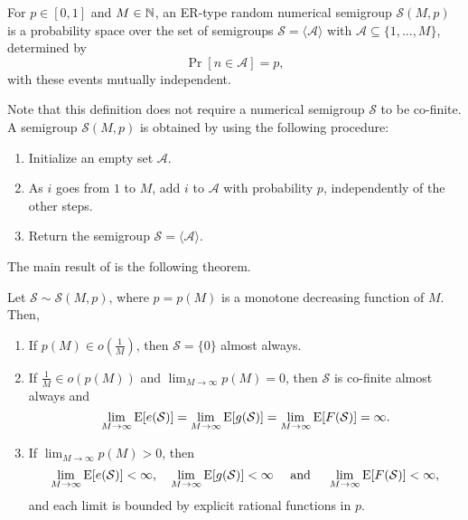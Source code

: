 \begin{definition}\label{def:randnumsems:ermodel}
    For $p \in [0, 1]$ and $M \in \mathbb{N}$, an ER-type random numerical semigroup $\mathcal{S}(M, p)$ is a probability space over the set of semigroups $\mathcal{S} = \langle\mathcal{A}\rangle$ with $\mathcal{A} \subseteq \{1,...,M\}$, determined by
    \[\Pr[n \in \mathcal{A}] = p,\]
    with these events mutually independent.
\end{definition}
Note that this definition does not require a numerical semigroup $\mathcal{S}$ to be co-finite. A semigroup $\mathcal{S}(M, p)$ is obtained by using the following procedure:
\begin{enumerate}
    \item Initialize an empty set $\mathcal{A}$.
    \item As $i$ goes from $1$ to $M$, add $i$ to $\mathcal{A}$ with probability $p$, independently of the other steps.
    \item Return the semigroup $\mathcal{S} = \langle\mathcal{A}\rangle$.
\end{enumerate}

The main result of \cite{de2018random} is the following theorem.  

\begin{theorem}\label{thm:ermodel} Let $\mathcal{S} \sim \mathcal{S}(M, p)$, where $p = p(M)$ is a monotone decreasing function of $M$. Then, 
    \begin{enumerate}[label=(\alph*)]
        \item If $p(M) \in o\left(\frac{1}{M}\right)$, then $\mathcal{S} = \{0\}$ almost always.
        \item If $\frac{1}{M} \in o(p(M))$ and $\lim_{M \to \infty} p(M)= 0$, then $\mathcal{S}$ is co-finite almost always and
         \[\lim_{M \to  \infty} \mathrm{E}[e(\mathcal{S})] = \lim_{M \to \infty} \mathrm{E}[g(\mathcal{S})] = \lim_{M \to \infty} \mathrm{E}[F(\mathcal{S})] = \infty.\]
        \item If $\lim_{M \to \infty} p(M) > 0$, then
        \[\lim_{M \to \infty} \mathrm{E}[e(\mathcal{S})] < \infty,  \quad \lim_{M \to \infty} \mathrm{E}[g(\mathcal{S})] < \infty \quad  \text{ and } \quad \lim_{M \to \infty} \mathrm{E}[F(\mathcal{S})]< \infty,\]
        and each limit is bounded by explicit rational functions in $p$.
    \end{enumerate}
\end{theorem}

